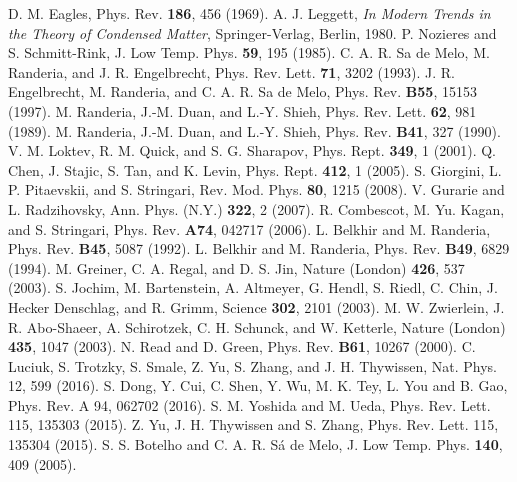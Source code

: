 \documentclass[aps,prd,amsmath,two column,nofootinbib,amssymb,referee]{revtex4}
\begin{document}
\begin{thebibliography}{99}
         D. M. Eagles, Phys. Rev. {\bf186}, 456 (1969).
        A. J. Leggett, \emph{In Modern Trends in the Theory of Condensed Matter}, Springer-Verlag, Berlin, 1980.
      P. Nozieres and S. Schmitt-Rink, J. Low Temp. Phys. {\bf59}, 195 (1985).
    C. A. R. Sa de Melo, M. Randeria, and J. R. Engelbrecht, Phys. Rev. Lett. {\bf71}, 3202 (1993).
 J. R. Engelbrecht, M. Randeria, and C. A. R. Sa de Melo, Phys. Rev. {\bf B55}, 15153 (1997).
      M. Randeria, J.-M. Duan, and L.-Y. Shieh, Phys. Rev. Lett. {\bf62}, 981 (1989).
      M. Randeria, J.-M. Duan, and L.-Y. Shieh, Phys. Rev. {\bf B41}, 327 (1990).
          V. M. Loktev, R. M. Quick, and S. G. Sharapov, Phys. Rept. {\bf349}, 1 (2001).
           Q. Chen, J. Stajic, S. Tan, and K. Levin, Phys. Rept. {\bf 412}, 1 (2005).
       S. Giorgini, L. P. Pitaevskii, and S. Stringari, Rev. Mod. Phys. {\bf80}, 1215 (2008).
       V. Gurarie and L. Radzihovsky, Ann. Phys. (N.Y.) {\bf322}, 2 (2007).
 R. Combescot, M. Yu. Kagan, and S. Stringari, Phys. Rev. {\bf A74}, 042717 (2006).
         L. Belkhir and M. Randeria, Phys. Rev. {\bf B45}, 5087 (1992).
         L. Belkhir and M. Randeria, Phys. Rev. {\bf B49}, 6829 (1994).
        M. Greiner, C. A. Regal, and D. S. Jin, Nature (London) {\bf426}, 537 (2003).
        S. Jochim, M. Bartenstein, A. Altmeyer, G. Hendl, S. Riedl, C. Chin, J. Hecker Denschlag, and R. Grimm, Science {\bf302}, 2101 (2003).
     M. W. Zwierlein, J. R. Abo-Shaeer, A. Schirotzek, C. H. Schunck, and W. Ketterle, Nature (London) {\bf435}, 1047 (2003).
           N. Read and D. Green, Phys. Rev. {\bf B61}, 10267 (2000).
       C. Luciuk, S. Trotzky, S. Smale, Z. Yu, S. Zhang, and J. H. Thywissen, Nat. Phys. 12, 599 (2016).
        S. Dong, Y. Cui, C. Shen, Y. Wu, M. K. Tey, L. You and B. Gao, Phys. Rev. A 94, 062702 (2016). 
      S. M. Yoshida and M. Ueda, Phys. Rev. Lett. 115, 135303 (2015).
           Z. Yu, J. H. Thywissen and S. Zhang, Phys. Rev. Lett. 115, 135304 (2015).
      S. S. Botelho and C. A. R. S\'a de Melo, J. Low Temp. Phys. {\bf140}, 409 (2005).

\end{thebibliography}
\end{document}
